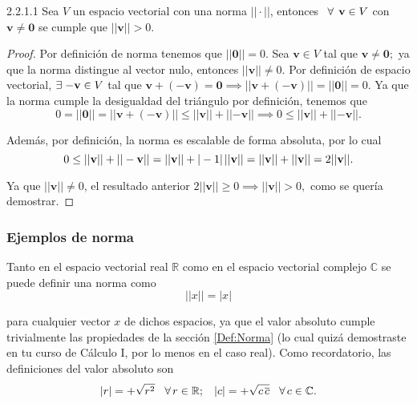 \begin{corolario} {2.2.1.1}
    Sea $V$ un espacio vectorial con una norma $||\cdot ||$, entonces $\hspace{1.5mm}\forall\hspace{1.5mm} \mathbf{v}\in V$ con $\mathbf{v}\neq\mathbf{0}$ se cumple que $||\mathbf{v}||>0.$

\begin{proof}
    Por definición de norma tenemos que $||\mathbf{0}||=0$. Sea $\mathbf{v}\in V$ tal que $\mathbf{v}\neq\mathbf{0};$ ya que la norma distingue al vector nulo, entonces $||\mathbf{v}||\neq 0.$ Por definición de espacio vectorial, $\exists\hspace{1mm} \mathbf{-v}\in V$ tal que $\mathbf{v}+(-\mathbf{v})=\mathbf{0}\implies ||\mathbf{v}+(-\mathbf{v})||=||\mathbf{0}||=0$. Ya que la norma cumple la desigualdad del triángulo por definición, tenemos que $$0=||\mathbf{0}||=||\mathbf{v}+(-\mathbf{v})||\leq ||\mathbf{v}||+||\mathbf{-v}||\implies 0\leq ||\mathbf{v}||+||\mathbf{-v}||.$$

\noindent Además, por definición, la norma es escalable de forma absoluta, por lo cual $$0\leq ||\mathbf{v}||+||-\mathbf{v}||=||\mathbf{v}||+|-1|\hspace{0.5mm} ||\mathbf{v}||=||\mathbf{v}||+||\mathbf{v}||=2||\mathbf{v}||.$$

\noindent Ya que $||\mathbf{v}||\neq 0$, el resultado anterior $2||\mathbf{v}||\geq 0\implies ||\mathbf{v}||>0,$ como se quería demostrar.

\end{proof}

\end{corolario}

\subsubsection{Ejemplos de norma}

Tanto en el espacio vectorial real $\mathbb{R}$ como en el espacio vectorial complejo $\mathbb{C}$ se puede definir una norma como $$||x|| = |x|$$

\noindent para cualquier vector $x$ de dichos espacios, ya que el valor absoluto cumple trivialmente las propiedades de la sección \ref{Def:Norma} (lo cual quizá demostraste en tu curso de Cálculo I, por lo menos en el caso real). Como recordatorio, las definiciones del valor absoluto son $$|r| = +\sqrt{r^2} \hspace{3mm}\forall\hspace{0.5mm}r\in\mathbb{
R}; \hspace{3mm} |c| = +\sqrt{c\hspace{0.5mm}\overline{c}}\hspace{3mm}\forall\hspace{0.5mm}c\in\mathbb{C}.$$

